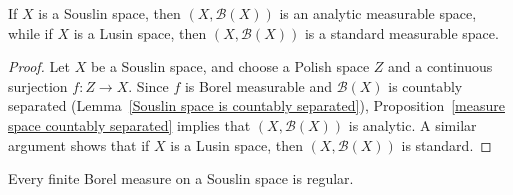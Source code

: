 \begin{proposition}\label{Souslin is analytic Lusin is standard}
If $X$ is a Souslin space, then $(X,\mathcal{B}(X))$ is an analytic measurable space, while if $X$ is a Lusin space, then $(X,\mathcal{B}(X))$ is a standard measurable space.
\end{proposition}
\begin{proof}
Let $X$ be a Souslin space, and choose a Polish space $Z$ and a continuous surjection $f:Z\to X$. Since $f$ is Borel measurable and $\mathcal{B}(X)$ is countably separated (Lemma~\ref{Souslin space is countably separated}), Proposition~\ref{measure space countably separated} implies that $(X,\mathcal{B}(X))$ is analytic. A similar argument shows that if $X$ is a Lusin space, then $(X,\mathcal{B}(X))$ is standard.
\end{proof}
\begin{theorem}\label{Souslin space finite Borel measure regular}
Every finite Borel measure on a Souslin space is regular.
\end{theorem}

